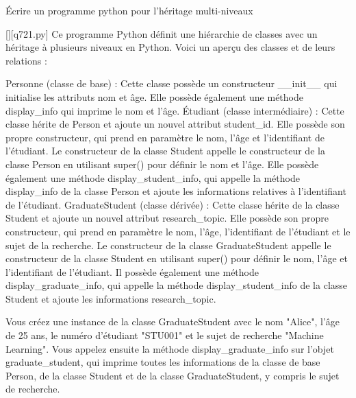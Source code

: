         \question
        Écrire un programme python pour l'héritage multi-niveaux
        \par
        \begin{solution}
            \renewcommand{\nomfichier}{q721.py}
            \pythonfile{\chemincode \nomfichier}[][\nomfichier]
            Ce programme Python définit une hiérarchie de classes avec un héritage à plusieurs niveaux en Python. Voici un aperçu des classes et de leurs relations :

    Personne (classe de base) : Cette classe possède un constructeur __init__ qui initialise les attributs nom et âge. Elle possède également une méthode display_info qui imprime le nom et l'âge.
    Étudiant (classe intermédiaire) : Cette classe hérite de Person et ajoute un nouvel attribut student_id. Elle possède son propre constructeur, qui prend en paramètre le nom, l'âge et l'identifiant de l'étudiant. Le constructeur de la classe Student appelle le constructeur de la classe Person en utilisant super() pour définir le nom et l'âge. Elle possède également une méthode display_student_info, qui appelle la méthode display_info de la classe Person et ajoute les informations relatives à l'identifiant de l'étudiant.
    GraduateStudent (classe dérivée) : Cette classe hérite de la classe Student et ajoute un nouvel attribut research_topic. Elle possède son propre constructeur, qui prend en paramètre le nom, l'âge, l'identifiant de l'étudiant et le sujet de la recherche. Le constructeur de la classe GraduateStudent appelle le constructeur de la classe Student en utilisant super() pour définir le nom, l'âge et l'identifiant de l'étudiant. Il possède également une méthode display_graduate_info, qui appelle la méthode display_student_info de la classe Student et ajoute les informations research_topic.

Vous créez une instance de la classe GraduateStudent avec le nom "Alice", l'âge de 25 ans, le numéro d'étudiant "STU001" et le sujet de recherche "Machine Learning". Vous appelez ensuite la méthode display_graduate_info sur l'objet graduate_student, qui imprime toutes les informations de la classe de base Person, de la classe Student et de la classe GraduateStudent, y compris le sujet de recherche.
        \end{solution}
        

